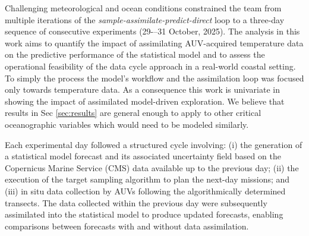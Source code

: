 

Challenging meteorological and ocean conditions constrained the team
from multiple iterations of the
\emph{sample-assimilate-predict-direct} loop to
a three-day sequence of consecutive experiments (29-–31 October,
2025). The analysis in this work aims to quantify the impact of
assimilating AUV-acquired temperature data on the predictive
performance of the statistical model and to assess the operational
feasibility of the data cycle approach in a real-world coastal
setting. To simply the process the model's workflow and the
assimilation loop was focused only towards temperature data. As a
consequence this work is univariate in showing the impact of
assimilated model-driven exploration. We believe that results in Sec
\ref{sec:results} are general enough to apply to other critical
oceanographic variables which would need to be modeled similarly.



Each experimental day followed a structured cycle involving: (i) the
generation of a statistical model forecast and its associated
uncertainty field based on the Copernicus Marine Service (CMS)
\cite{sotillo2021} data available up to the previous day; (ii) the
execution of the target sampling algorithm to plan the next-day
missions; and (iii) in situ data collection by AUVs following the
algorithmically determined transects. The data collected within the
previous day were subsequently assimilated into the statistical model
to produce updated forecasts, enabling comparisons between forecasts
with and without data assimilation.


